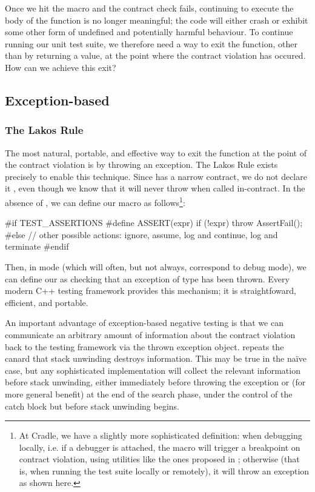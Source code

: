 Once we hit the  macro and the contract check fails, continuing to execute the body of the function is no longer meaningful; the code will either crash or exhibit some other form of undefined and potentially harmful behaviour. To continue running our unit test suite, we therefore need a way to exit the function, other than by returning a value, at the point where the contract violation has occured. How can we achieve this exit?

\subsection{Exception-based}

\subsubsection{The Lakos Rule}

The most natural, portable, and effective way to exit the function at the point of the contract violation is by throwing an exception. The Lakos Rule exists precisely to enable this technique. Since  has a narrow contract, we do not declare it , even though we know that it will never throw when called in-contract. In the absence of , we can define our  macro as follows\footnote{At Cradle, we have a slightly more sophisticated definition: when debugging locally, i.e. if a debugger is attached, the  macro will trigger a breakpoint on contract violation, using utilities like the ones proposed in \cite{P2514R0}; otherwise (that is, when running the test suite locally or remotely), it will throw an  exception as shown here.}:
\begin{codeblock}
#if TEST_ASSERTIONS
  #define ASSERT(expr) if (!expr) throw AssertFail();
#else
  // other possible actions: ignore, assume, log and continue, log and terminate
#endif
\end{codeblock}
Then, in  mode (which will often, but not always, correspond to debug mode), we can define our  as checking that an exception of type  has been thrown. Every modern C++ testing framework provides this mechanism; it is straightfoward, efficient, and portable.

An important advantage of exception-based negative testing is that we can communicate an arbitrary amount of information about the contract violation back to the testing framework via the thrown exception object. \cite{P1656R2} repeats the canard that stack unwinding destroys information. This may be true in the na\" ive case, but any sophisticated implementation will collect the relevant information before stack unwinding, either immediately before throwing the exception or (for more general benefit) at the end of the search phase, under the control of the catch block but before stack unwinding begins.

